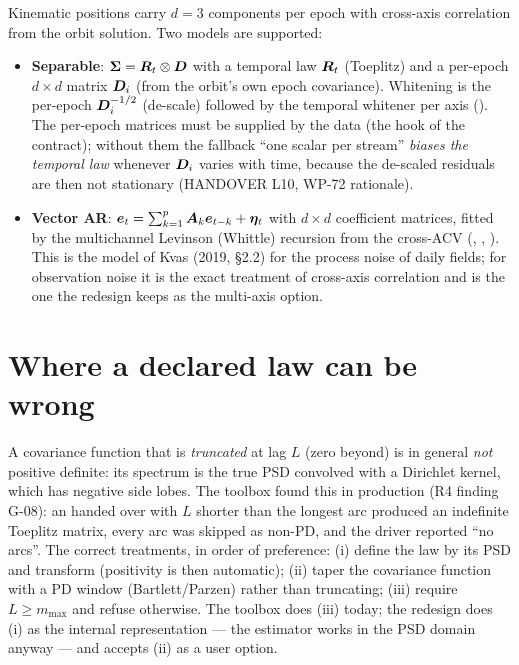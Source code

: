 Kinematic positions carry $d=3$ components per epoch with cross-axis correlation from the orbit solution. Two models are supported:
\begin{itemize}
\item \textbf{Separable}: $\bm{\Sigma} = \bm{R}_t \otimes \bm{D}$ with a temporal law $\bm{R}_t$ (Toeplitz) and a per-epoch $d\times d$ matrix $\bm{D}_i$ (from the orbit's own epoch covariance). Whitening is the per-epoch $\bm{D}_i^{-1/2}$ (de-scale) followed by the temporal whitener per axis (). The per-epoch matrices must be supplied by the data (the  hook of the contract); without them the fallback ``one scalar per stream'' \emph{biases the temporal law} whenever $\bm{D}_i$ varies with time, because the de-scaled residuals are then not stationary (HANDOVER L10, WP-72 rationale).
\item \textbf{Vector AR}: $\bm{e}_t = \sum_{k=1}^p \bm{A}_k \bm{e}_{t-k} + \bm{\eta}_t$ with $d\times d$ coefficient matrices, fitted by the multichannel Levinson (Whittle) recursion from the cross-ACV (, , ). This is the model of Kvas (2019, §2.2) for the process noise of daily fields; for observation noise it is the exact treatment of cross-axis correlation and is the one the redesign keeps as the multi-axis option.
\end{itemize}

\section{Where a declared law can be wrong}
\label{sec:nonpd}

\begin{caveat}
A covariance function that is \emph{truncated} at lag $L$ (zero beyond) is in general \emph{not} positive definite: its spectrum is the true PSD convolved with a Dirichlet kernel, which has negative side lobes. The toolbox found this in production (R4 finding G-08): an  handed over with $L$ shorter than the longest arc produced an indefinite Toeplitz matrix, every arc was skipped as non-PD, and the driver reported ``no arcs''. The correct treatments, in order of preference: (i) define the law by its PSD and transform (positivity is then automatic); (ii) taper the covariance function with a PD window (Bartlett/Parzen) rather than truncating; (iii) require $L \ge m_{\max}$ and refuse otherwise. The toolbox does (iii) today; the redesign does (i) as the internal representation --- the estimator works in the PSD domain anyway --- and accepts (ii) as a user option.
\end{caveat}

